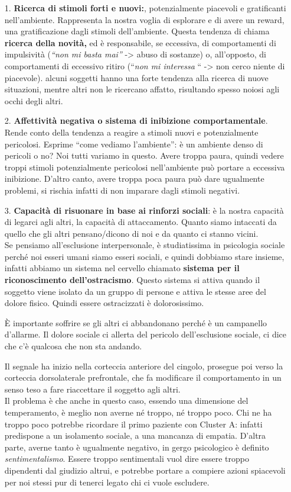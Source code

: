 \begin{itemize}
\item[1.]
  \textbf{Ricerca di stimoli forti e nuovi:}, potenzialmente piacevoli e
  gratificanti nell'ambiente. Rappresenta la nostra voglia di esplorare
  e di avere un reward, una gratificazione dagli stimoli dell'ambiente.
  Questa tendenza di chiama \textbf{ricerca della novità,} ed è
  responsabile, se eccessiva, di comportamenti di impulsività
  (\emph{``non mi basta mai''} -\textgreater{} abuso di sostanze) o,
  all'opposto, di comportamenti di eccessivo ritiro (``\emph{non mi
  interessa} `` -\textgreater{} non cerco niente di piacevole). alcuni
  soggetti hanno una forte tendenza alla ricerca di nuove situazioni,
  mentre altri non le ricercano affatto, risultando spesso noiosi agli
  occhi degli altri.
\item[2.]
  \textbf{Affettività negativa o sistema di inibizione comportamentale}.
  Rende conto della tendenza a reagire a stimoli nuovi e potenzialmente
  pericolosi. Esprime ``come vediamo l'ambiente'': è un ambiente denso
  di pericoli o no? Noi tutti variamo in questo. Avere troppa paura,
  quindi vedere troppi stimoli potenzialmente pericolosi nell'ambiente
  può portare a eccessiva inibizione. D'altro canto, avere troppa poca
  paura può dare ugualmente problemi, si rischia infatti di non imparare
  dagli stimoli negativi.
\item[3.]
  \textbf{Capacità di risuonare in base ai rinforzi sociali}: è la
  nostra capacità di legarci agli altri, la capacità di attaccamento.
  Quanto siamo intaccati da quello che gli altri pensano/dicono di noi e
  da quanto ci stanno vicini.\\
  Se pensiamo all'esclusione interpersonale, è studiatissima in
  psicologia sociale perché noi esseri umani siamo esseri sociali, e
  quindi dobbiamo stare insieme, infatti abbiamo un sistema nel cervello
  chiamato \textbf{sistema per il riconoscimento
  dell'ostracismo}\emph{.} Questo sistema si attiva quando il soggetto
  viene isolato da un gruppo di persone e attiva le stesse aree del
  dolore fisico. Quindi essere ostracizzati è dolorosissimo.

È importante soffrire se gli altri ci abbandonano perché è un campanello
d'allarme. Il dolore sociale ci allerta del pericolo dell'esclusione
sociale, ci dice che c'è qualcosa che non sta andando.

Il segnale ha inizio nella corteccia anteriore del cingolo, prosegue poi
verso la corteccia dorsolaterale prefrontale, che fa modificare il
comportamento in un senso teso a fare riaccettare il soggetto agli
altri.\\
Il problema è che anche in questo caso, essendo una dimensione del
temperamento, è meglio non averne né troppo, né troppo poco. Chi ne ha
troppo poco potrebbe ricordare il primo paziente con Cluster A: infatti
predispone a un isolamento sociale, a una mancanza di empatia. D'altra
parte, averne tanto è ugualmente negativo, in gergo psicologico è
definito \emph{sentimentalismo}. Essere troppo sentimentali vuol dire
essere troppo dipendenti dal giudizio altrui, e potrebbe portare a
compiere azioni spiacevoli per noi stessi pur di tenerci legato chi ci
vuole escludere.


\end{itemize}
